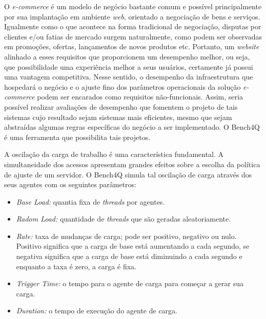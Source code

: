 O \textit{e-commerce} é um modelo de negócio bastante comum e possível principalmente por sua implantação em ambiente \textit{ web}, orientado a negociação de bens e serviços. Igualmente como o que acontece na forma tradicional de negociação, disputas por clientes e/ou fatias de mercado surgem naturalmente, como podem ser observadas em promoções, ofertas, lançamentos de novos produtos etc. Portanto, um \textit{ website} alinhado a esses requisitos que proporcionem um desempenho melhor, ou seja, que possibilidade uma experiência melhor a seus usuários, certamente já possui uma vantagem competitiva. Nesse sentido, o desempenho da infraestrutura que hospedará o negócio e o ajuste fino dos parâmetros operacionais da solução \textit{e-commerce} podem ser encarados como requisitos não-funcionais. Assim, seria possível realizar avaliações de desempenho que fomentem o projeto de tais sistemas cujo resultado sejam sistemas mais eficientes, mesmo que sejam abstraídas algumas regras específicas do negócio a ser implementado. O Bench4Q é uma ferramenta que possibilita tais projetos.

A oscilação da carga de trabalho é uma característica fundamental. A simultaneidade dos acessos apresentam grandes efeitos sobre a escolha da política de ajuste de um servidor. O Bench4Q simula tal oscilação de carga através dos seus agentes com os seguintes parâmetros:

\begin{itemize}
	\item \textit{Base Load:} quantia fixa de \textit{threads} por agentes.
	\item \textit{Radom Load:} quantidade de \textit{threads} que são geradas aleatoriamente.
	\item \textit{Rate:} taxa de mudanças de carga; pode ser positivo, negativo ou nulo. Positivo significa que a carga de base está aumentando a cada segundo, se negativa significa que a carga de base está diminuindo a cada segundo e enquanto a taxa é zero, a carga é fixa.
	\item \textit{Trigger Time:} o tempo para o agente de carga para começar a gerar sua carga.
	\item \textit{Duration:} o tempo de execução do agente de carga.
\end{itemize}

